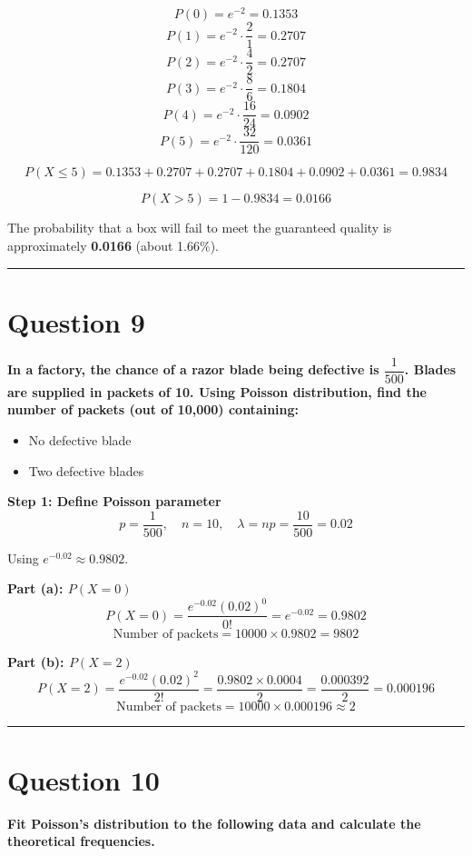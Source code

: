\documentclass[12pt,a4paper]{article}
\begin{document}
\[
P(0) = e^{-2} = 0.1353
\]
\[
P(1) = e^{-2}\cdot\frac{2}{1} = 0.2707
\]
\[
P(2) = e^{-2}\cdot\frac{4}{2} = 0.2707
\]
\[
P(3) = e^{-2}\cdot\frac{8}{6} = 0.1804
\]
\[
P(4) = e^{-2}\cdot\frac{16}{24} = 0.0902
\]
\[
P(5) = e^{-2}\cdot\frac{32}{120} = 0.0361
\]

\[
P(X \leq 5) = 0.1353 + 0.2707 + 0.2707 + 0.1804 + 0.0902 + 0.0361 = 0.9834
\]

\[
P(X > 5) = 1 - 0.9834 = \boxed{0.0166}
\]

The probability that a box will fail to meet the guaranteed quality is approximately \textbf{0.0166} (about 1.66\%).

\vspace{1em}\hrule\vspace{1em}

\section{Question 9}
\textbf{In a factory, the chance of a razor blade being defective is $\dfrac{1}{500}$. Blades are supplied in packets of 10. Using Poisson distribution, find the number of packets (out of 10,000) containing:}
\begin{itemize}[noitemsep]
\item[(a)] No defective blade
\item[(b)] Two defective blades
\end{itemize}

\textbf{Step 1: Define Poisson parameter}
\[
p = \frac{1}{500},\quad n = 10,\quad \lambda = np = \frac{10}{500} = 0.02
\]

Using $e^{-0.02} \approx 0.9802$.

\textbf{Part (a): $P(X = 0)$}
\[
P(X=0) = \frac{e^{-0.02}(0.02)^0}{0!} = e^{-0.02} = 0.9802
\]
\[
\text{Number of packets} = 10000 \times 0.9802 = \boxed{9802}
\]

\textbf{Part (b): $P(X = 2)$}
\[
P(X=2) = \frac{e^{-0.02}(0.02)^2}{2!} = \frac{0.9802 \times 0.0004}{2} = \frac{0.000392}{2} = 0.000196
\]
\[
\text{Number of packets} = 10000 \times 0.000196 \approx \boxed{2}
\]

\vspace{1em}\hrule\vspace{1em}

\section{Question 10}
\textbf{Fit Poisson's distribution to the following data and calculate the theoretical frequencies.}
\end{document}
